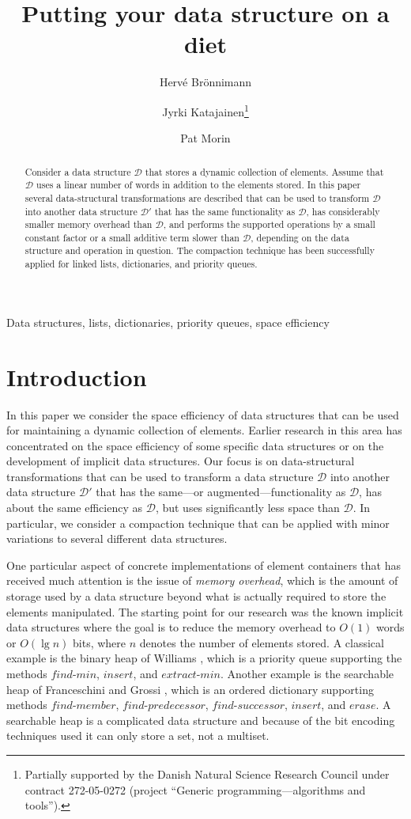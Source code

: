 \documentclass{DIKU-article}
\title{Putting your data structure on a diet}
\author{Herv\'e Br\"onnimann\inst{1}
\and
Jyrki Katajainen\inst{2}\fnmsep\thanks{%
Partially supported by the Danish Natural Science
Research Council under contract 272-05-0272
(project ``Generic programming---algorithms and tools'').%
}
\and
Pat Morin\inst{3}%
}
\institute{Department of Computer and Information Science, Polytechnic University\\
Six Metrotech, Brooklyn NY 11201, USA
\and
Department of Computing, University of Copenhagen\\
Universitetsparken 1, 2100 Copenhagen East, Denmark
\and
School of Computer Science,
Carleton University\\
1125 Colonel By Drive,
Ottawa, Ontario, Canada K1S 5B6 
}
\newcommand{\seclabel}[1]{\label{sec:#1}}
\newcommand{\Findmin}{\mbox{$\mathit{find}$}\textnormal{-}\allowbreak{}\mbox{$\mathit{min}$}}
\newcommand{\Member}{\mbox{$\mathit{find}$}\textnormal{-}\allowbreak{}\mbox{$\mathit{member}$}}
\newcommand{\Predecessor}{\mbox{$\mathit{find}$}\textnormal{-}\allowbreak{}\mbox{$\mathit{predecessor}$}}
\newcommand{\Successor}{\mbox{$\mathit{find}$}\textnormal{-}\allowbreak{}\mbox{$\mathit{successor}$}}
\newcommand{\Insert}{\mbox{$\mathit{insert}$}}
\newcommand{\Erase}{\mbox{$\mathit{erase}$}}
\newcommand{\Extractmin}{\mbox{$\mathit{extract}$}\textnormal{-}\allowbreak{}\mbox{$\mathit{min}$}}
\begin{document}
\maketitle
\begin{abstract}
Consider a data structure $\mathcal{D}$ that stores a dynamic
collection of elements. Assume that $\mathcal{D}$ uses a linear number
of words in addition to the elements stored.  In this paper several
data-structural transformations are described that can be used to
transform $\mathcal{D}$ into another data structure $\mathcal{D}'$
that has the same functionality as $\mathcal{D}$, has considerably
smaller memory overhead than $\mathcal{D}$, and performs the supported
operations by a small constant factor or a small additive term slower
than $\mathcal{D}$, depending on the data structure and operation in
question. The compaction technique has been successfully applied for
linked lists, dictionaries, and priority queues.
\end{abstract}

\begin{keywords}
Data structures, lists, dictionaries, priority queues, space efficiency
\end{keywords}

\section{Introduction}
\seclabel{intro}

In this paper we consider the space efficiency of data structures that
can be used for maintaining a dynamic collection of
elements. Earlier research in this area has concentrated on the space
efficiency of some specific data structures or on the development of
implicit data structures. Our focus is on data-structural
transformations that can be used to transform a data structure
$\mathcal{D}$ into another data structure $\mathcal{D}'$ that has the
same---or augmented---functionality as $\mathcal{D}$, has about the same efficiency as
$\mathcal{D}$, but uses significantly less space than $\mathcal{D}$.
In particular, we consider a compaction technique that can be
applied with minor variations to several different data structures.

One particular aspect of concrete implementations of element containers
that has received much attention is the issue of \emph{memory
overhead}, which is the amount of storage used by a data
structure beyond what is actually required to store the elements manipulated.
The starting point for our research was the known implicit data
structures where the goal is to reduce the memory overhead to $O(1)$ words
or $O(\lg n)$ bits, where $n$ denotes the number of elements stored.  A
classical example is the binary heap of Williams \cite{Wil64}, which is a
priority queue supporting the methods \Findmin{}, \Insert{}, and
\Extractmin{}. Another example is the searchable heap of Franceschini
and Grossi \cite{FG03}, which is an ordered dictionary supporting
methods \Member{}, \Predecessor{}, \Successor{}, \Insert{}, and
\Erase{}. A searchable heap is a complicated data structure and
because of the bit encoding techniques used it can only store a set,
not a multiset.
\end{document}
